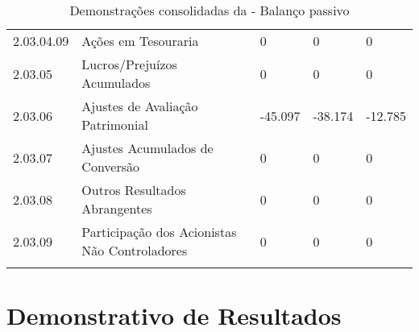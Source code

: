 \begin{center}
\begin{longtable}{p{}|p{}|p{}|p{}|p{}}
2.03.04.09 & Ações em Tesouraria & 0 & 0 & 0\tabularnewline
2.03.05 & Lucros/Prejuízos Acumulados & 0 & 0 & 0\tabularnewline
2.03.06 & Ajustes de Avaliação Patrimonial & -45.097 & -38.174 & -12.785\tabularnewline
2.03.07 & Ajustes Acumulados de Conversão & 0 & 0 & 0\tabularnewline
2.03.08 & Outros Resultados Abrangentes & 0 & 0 & 0\tabularnewline
2.03.09 & Participação dos Acionistas Não Controladores & 0 & 0 & 0\tabularnewline
\hline
\caption{Demonstrações consolidadas da \nomeCompletoPositivo{} - Balanço passivo}
\end{longtable}
\vspace*{-40pt}
\par\end{center}

\section{Demonstrativo de Resultados}

